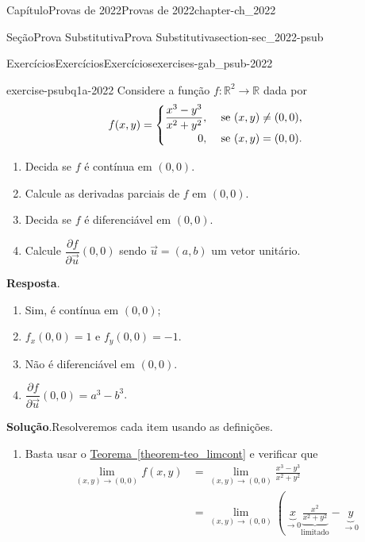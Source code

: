 \documentclass[oneside,10pt,]{book}
\newcommand{\blocktitlefont}{\relax}
\newcommand{\xreffont}{\relax}
\numberwithin{equation}{section}
\newcommand{\R}{\mathbb R}
\begin{document}
\begin{chapterptx}{Capítulo}{Provas de 2022}{}{Provas de 2022}{}{}{chapter-ch_2022}
\begin{sectionptx}{Seção}{Prova Substitutiva}{}{Prova Substitutiva}{}{}{section-sec_2022-psub}
%
\begin{exercises-subsection-numberless}{Exercícios}{Exercícios}{}{Exercícios}{}{}{exercises-gab_psub-2022}
\begin{divisionexercise}{1}{}{}{exercise-psubq1a-2022}%
Considere a função \(f\colon\R^2\to\R\) dada por%
\begin{equation*}
f(x,y)=
\begin{cases}
\dfrac{x^3-y^3}{x^2+y^2},&\text{ se } (x,y) \neq (0,0),\\
\hfill 0,&\text{ se } (x,y)=(0,0).
\end{cases}
\end{equation*}
%
\begin{enumerate}[label=\alph*.]
\item{}Decida se \(f\) é contínua em \((0,0)\).%
\item{}Calcule as derivadas parciais de \(f\) em \((0,0)\).%
\item{}Decida se \(f\) é diferenciável em \((0,0)\).%
\item{}Calcule \(\dfrac{\partial f}{\partial \vec{u}}(0,0)\) sendo \(\vec{u} =(a,b)\) um vetor unitário.%
\end{enumerate}
%
\par\smallskip%
\noindent\textbf{\blocktitlefont Resposta}.\hypertarget{answer-psubq1a-2022-b}{}\quad{}%
\begin{enumerate}[label=\alph*.]
\item{}Sim, é contínua em \((0,0)\);%
\item{}\(f_x(0,0)=1\) e \(f_y(0,0)=-1\).%
\item{}Não é diferenciável em \((0,0)\).%
\item{}\(\dfrac{\partial f}{\partial \vec{u}}(0,0)=a^3-b^3\).%
\end{enumerate}
%
\par\smallskip%
\noindent\textbf{\blocktitlefont Solução}.\hypertarget{solution-psubq1a-2022-c}{}\quad{}Resolveremos cada item usando as definições.%
\par
%
\begin{enumerate}[label=\alph*.]
\item{}Basta usar o \hyperref[theorem-teo_limcont]{Teorema~{\xreffont\ref{theorem-teo_limcont}}} e verificar que%
\begin{align*}
\lim_{(x,y) \to (0,0)} f(x,y) &=
\lim_{(x,y) \to (0,0)}\frac{x^3-y^3}{x^2+y^2}\\
&=\lim_{(x,y)\to (0,0)} \left( \underbrace{x}_{\to 0}
\underbrace{\frac{x^2}{x^2+y^2}}_{\text{limitado}} -
\underbrace{y}_{\to 0}

\end{align*}
\end{enumerate}
\end{divisionexercise}
\end{exercises-subsection-numberless}
\end{sectionptx}
\end{chapterptx}
\end{document}
